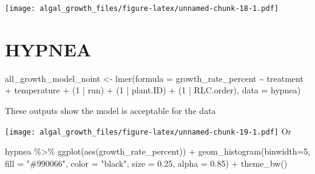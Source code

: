 \documentclass[
]{article}
\newenvironment{Shaded}{\begin{snugshade}}{\end{snugshade}}
\newcommand{\AttributeTok}[1]{\textcolor[rgb]{0.77,0.63,0.00}{#1}}
\newcommand{\ConstantTok}[1]{\textcolor[rgb]{0.00,0.00,0.00}{#1}}
\newcommand{\DecValTok}[1]{\textcolor[rgb]{0.00,0.00,0.81}{#1}}
\newcommand{\FloatTok}[1]{\textcolor[rgb]{0.00,0.00,0.81}{#1}}
\newcommand{\FunctionTok}[1]{\textcolor[rgb]{0.00,0.00,0.00}{#1}}
\newcommand{\NormalTok}[1]{#1}
\newcommand{\OtherTok}[1]{\textcolor[rgb]{0.56,0.35,0.01}{#1}}
\newcommand{\SpecialCharTok}[1]{\textcolor[rgb]{0.00,0.00,0.00}{#1}}
\newcommand{\StringTok}[1]{\textcolor[rgb]{0.31,0.60,0.02}{#1}}
\begin{document}
\texttt{[image: algal\_growth\_files/figure-latex/unnamed-chunk-18-1.pdf]}

\hypertarget{hypnea}{%
\section{HYPNEA}\label{hypnea}}

\begin{Shaded}
\begin{Highlighting}[]
\NormalTok{all\_growth\_model\_noint }\OtherTok{\textless{}{-}} \FunctionTok{lmer}\NormalTok{(}\AttributeTok{formula =}\NormalTok{ growth\_rate\_percent }\SpecialCharTok{\textasciitilde{}}\NormalTok{ treatment }\SpecialCharTok{+}\NormalTok{ temperature }\SpecialCharTok{+} 
\NormalTok{                                 (}\DecValTok{1} \SpecialCharTok{|}\NormalTok{ run) }\SpecialCharTok{+}\NormalTok{ (}\DecValTok{1} \SpecialCharTok{|}\NormalTok{ plant.ID) }\SpecialCharTok{+}\NormalTok{ (}\DecValTok{1} \SpecialCharTok{|}\NormalTok{ RLC.order), }\AttributeTok{data =}\NormalTok{ hypnea)}
\end{Highlighting}
\end{Shaded}

These outputs show the model is acceptable for the data

\begin{Shaded}
\end{Shaded}

\texttt{[image: algal\_growth\_files/figure-latex/unnamed-chunk-19-1.pdf]}
Or

\begin{Shaded}
\begin{Highlighting}[]
\NormalTok{hypnea }\SpecialCharTok{\%\textgreater{}\%} \FunctionTok{ggplot}\NormalTok{(}\FunctionTok{aes}\NormalTok{(growth\_rate\_percent)) }\SpecialCharTok{+}
  \FunctionTok{geom\_histogram}\NormalTok{(}\AttributeTok{binwidth=}\DecValTok{5}\NormalTok{, }\AttributeTok{fill =} \StringTok{"\#990066"}\NormalTok{, }\AttributeTok{color =} \StringTok{"black"}\NormalTok{, }\AttributeTok{size =} \FloatTok{0.25}\NormalTok{, }\AttributeTok{alpha =} \FloatTok{0.85}\NormalTok{) }\SpecialCharTok{+}
  \FunctionTok{theme\_bw}\NormalTok{()}
\end{Highlighting}
\end{Shaded}
\end{document}
